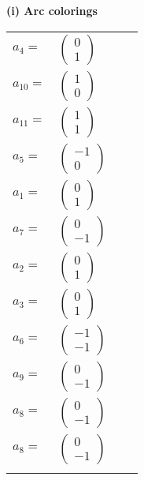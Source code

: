 \documentclass[1p]{elsarticle_modified}
\theoremstyle{definition}
\begin{document}
\flushleft \textbf{(i) Arc colorings}\\
\begin{tabular}{m{7pt} m{180pt} m{7pt} m{180pt} }
\flushright $a_{4}=$&$\begin{pmatrix}0\\1\end{pmatrix}$ \\
\flushright $a_{10}=$&$\begin{pmatrix}1\\0\end{pmatrix}$ \\
\flushright $a_{11}=$&$\begin{pmatrix}1\\1\end{pmatrix}$ \\
\flushright $a_{5}=$&$\begin{pmatrix}-1\\0\end{pmatrix}$ \\
\flushright $a_{1}=$&$\begin{pmatrix}0\\1\end{pmatrix}$ \\
\flushright $a_{7}=$&$\begin{pmatrix}0\\-1\end{pmatrix}$ \\
\flushright $a_{2}=$&$\begin{pmatrix}0\\1\end{pmatrix}$ \\
\flushright $a_{3}=$&$\begin{pmatrix}0\\1\end{pmatrix}$ \\
\flushright $a_{6}=$&$\begin{pmatrix}-1\\-1\end{pmatrix}$ \\
\flushright $a_{9}=$&$\begin{pmatrix}0\\-1\end{pmatrix}$ \\
\flushright $a_{8}=$&$\begin{pmatrix}0\\-1\end{pmatrix}$\\ \flushright $a_{8}=$&$\begin{pmatrix}0\\-1\end{pmatrix}$\\&\end{tabular}
\end{document}
